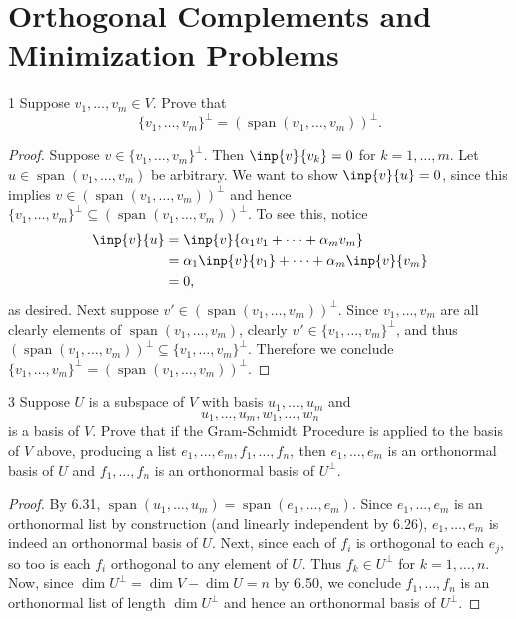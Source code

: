 \documentclass{extarticle}
\newenvironment{problem}[1]{\begin{prob*}{#1}{}}{\end{prob*}}
\DeclareMathOperator{\Span}{span}
\begin{document}
\section{Orthogonal Complements and Minimization Problems}

\begin{problem}{1}
Suppose $v_1,\dots, v_m \in V$.  Prove that 
\begin{equation*}
\{v_1, \dots, v_m\}^\perp = (\Span(v_1,\dots, v_m))^\perp.
\end{equation*}
\end{problem}
\begin{proof}
Suppose $v\in \{v_1,\dots, v_m\}^\perp$.  Then $\inp{v}{v_k}=0$ for $k=1,\dots,m$.  Let $u\in \Span(v_1,\dots, v_m)$ be arbitrary.  We want to show $\inp{v}{u} = 0$, since this implies $v \in (\Span(v_1,\dots, v_m))^\perp$ and hence $\{v_1, \dots, v_m\}^\perp \subseteq (\Span(v_1,\dots, v_m))^\perp$.  To see this, notice 
\begin{align*}
\inp{v}{u} &= \inp{v}{\alpha_1v_1 + \dots + \alpha_m v_m}\\
&= \alpha_1\inp{v}{v_1} + \dots + \alpha_m\inp{v}{v_m}\\
&= 0,
\end{align*}
as desired.  Next suppose $v'\in (\Span(v_1,\dots, v_m))^\perp$.  Since $v_1,\dots,v_m$ are all clearly elements of $\Span(v_1,\dots, v_m)$, clearly $v'\in \{v_1, \dots, v_m\}^\perp$, and thus $(\Span(v_1,\dots, v_m))^\perp \subseteq \{v_1, \dots, v_m\}^\perp$.  Therefore we conclude $\{v_1, \dots, v_m\}^\perp = (\Span(v_1,\dots, v_m))^\perp$.
\end{proof}

\begin{problem}{3}
Suppose $U$ is a subspace of $V$ with basis $u_1,\dots, u_m$ and
\begin{equation*}
u_1, \dots, u_m, w_1, \dots, w_n 
\end{equation*}
is a basis of $V$.  Prove that if the Gram-Schmidt Procedure is applied to the basis of $V$ above, producing a list $e_1,\dots, e_m, f_1,\dots, f_n$, then $e_1,\dots, e_m$ is an orthonormal basis of $U$ and $f_1,\dots, f_n$ is an orthonormal basis of $U^\perp$.
\end{problem}
\begin{proof}
By 6.31, $\Span(u_1,\dots, u_m) = \Span(e_1,\dots, e_m)$.  Since $e_1,\dots, e_m$ is an orthonormal list by construction (and linearly independent by 6.26), $e_1,\dots, e_m$ is indeed an orthonormal basis of $U$.  Next, since each of $f_i$ is orthogonal to each $e_j$, so too is each $f_i$ orthogonal to any element of $U$.  Thus $f_k\in U^\perp$ for $k=1,\dots,n$.  Now, since $\dim U^\perp = \dim V - \dim U = n$ by 6.50, we conclude $f_1,\dots, f_n$ is an orthonormal list of length $\dim U^\perp$ and hence an orthonormal basis of $U^\perp$.
\end{proof}
\end{document}
